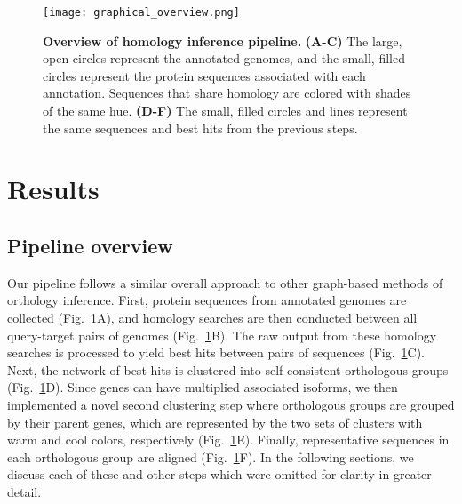 \begin{figure}[h!]
\texttt{[image: graphical\_overview.png]}
\centering
\caption{\textbf{Overview of homology inference pipeline.}
\textbf{(A-C)} The large, open circles represent the annotated genomes, and the small, filled circles represent the protein sequences associated with each annotation. Sequences that share homology are colored with shades of the same hue. \textbf{(D-F)} The small, filled circles and lines represent the same sequences and best hits from the previous steps.}
\label{fig:graphical_overview}
\end{figure}

\section*{Results}
\subsection*{Pipeline overview}
Our pipeline follows a similar overall approach to other graph-based methods of orthology inference. First, protein sequences from annotated genomes are collected (Fig.~\ref{fig:graphical_overview}A), and homology searches are then conducted between all query-target pairs of genomes (Fig.~\ref{fig:graphical_overview}B). The raw output from these homology searches is processed to yield best hits between pairs of sequences (Fig.~\ref{fig:graphical_overview}C). Next, the network of best hits is clustered into self-consistent orthologous groups (Fig.~\ref{fig:graphical_overview}D). Since genes can have multiplied associated isoforms, we then implemented a novel second clustering step where orthologous groups are grouped by their parent genes, which are represented by the two sets of clusters with warm and cool colors, respectively (Fig.~\ref{fig:graphical_overview}E). Finally, representative sequences in each orthologous group are aligned (Fig.~\ref{fig:graphical_overview}F). In the following sections, we discuss each of these and other steps which were omitted for clarity in greater detail.

